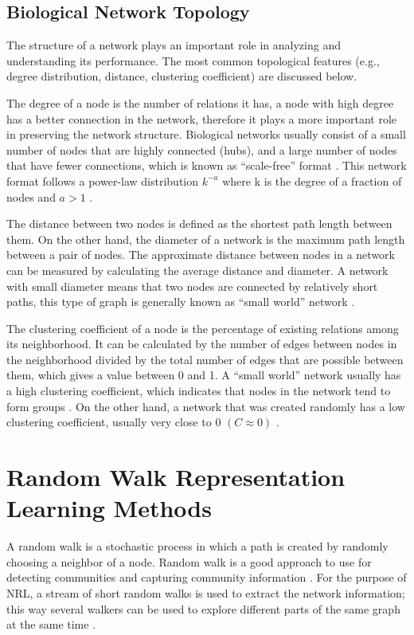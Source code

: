 \subsection{Biological Network Topology}

The structure of a network plays an important role in analyzing and understanding its performance.
The most common topological features (e.g., degree distribution, distance, clustering coefficient) are discussed below.

The degree of a node is the number of relations it has, a node with high degree has a better connection in the network, therefore it plays a more important role in preserving the network structure.
Biological networks usually consist of a small number of nodes that are highly connected (hubs), and a large number of nodes that have fewer connections, which is known as “scale-free” format \cite{zhu_getting_2007}.
This network format follows a power-law distribution $k^{-a}$ where k is the degree of a fraction of nodes and $a>1$ \cite{broido_scale-free_2019}.

The distance between two nodes is defined as the shortest path length between them.
On the other hand, the diameter of a network is the maximum path length between a pair of nodes.
The approximate distance between nodes in a network can be measured by calculating the average distance and diameter.
A network with small diameter means that two nodes are connected by relatively short paths, this type of graph is generally known as “small world” network \cite{zhu_getting_2007}.

The clustering coefficient of a node is the percentage of existing relations among its neighborhood.
It can be calculated by the number of edges between nodes in the neighborhood divided by the total number of edges that are possible between them, which gives a value between 0 and 1.
A “small world” network usually has a high clustering coefficient, which indicates that nodes in the network tend to form groups \cite{zhu_getting_2007}.
On the other hand, a network that was created randomly has a low clustering coefficient, usually very close to 0 $(C \approx 0)$ \cite{newman_random_2002}.

\section{Random Walk Representation Learning Methods}

A random walk is a stochastic process in which a path is created by randomly choosing a neighbor of a node.
Random walk is a good approach to use for detecting communities and capturing community information \cite{perozzi_deepwalk:_2014}.
For the purpose of \ac{NRL}, a stream of short random walks is used to extract the network information; this way several walkers can be used to explore different parts of the same graph at the same time \cite{perozzi_deepwalk:_2014}.

